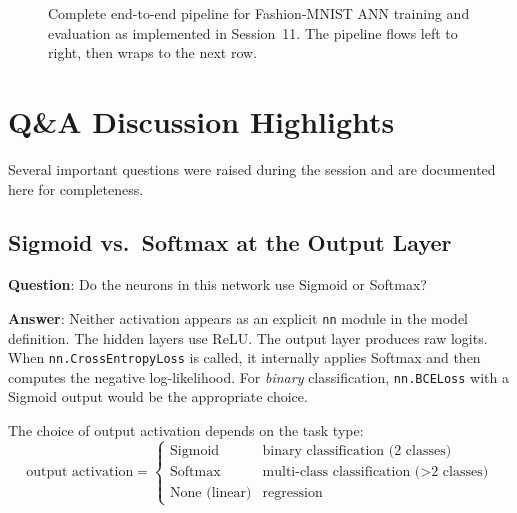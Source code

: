 \documentclass[12pt,a4paper]{article}
\begin{document}
\begin{figure}[htbp]
\caption{Complete end-to-end pipeline for Fashion-MNIST ANN training and
evaluation as implemented in Session~11.  The pipeline flows left to right,
then wraps to the next row.}
\label{fig:pipeline}
\end{figure}

\section{Q\&A Discussion Highlights}
\label{sec:qa}

Several important questions were raised during the session and are documented
here for completeness.

\subsection{Sigmoid vs.\ Softmax at the Output Layer}

\textbf{Question}: Do the neurons in this network use Sigmoid or Softmax?

\textbf{Answer}: Neither activation appears as an explicit \texttt{nn} module
in the model definition.  The hidden layers use ReLU.  The output layer
produces raw logits.  When \texttt{nn.CrossEntropyLoss} is called, it
internally applies Softmax and then computes the negative log-likelihood.  For
\emph{binary} classification, \texttt{nn.BCELoss} with a Sigmoid output would
be the appropriate choice.

The choice of output activation depends on the task type:
\begin{equation}
  \text{output activation} =
  \begin{cases}
    \text{Sigmoid} & \text{binary classification (2 classes)} \\
    \text{Softmax} & \text{multi-class classification ($>$2 classes)} \\
    \text{None (linear)} & \text{regression}
  \end{cases}
  \label{eq:activation-choice}
\end{equation}
\end{document}
